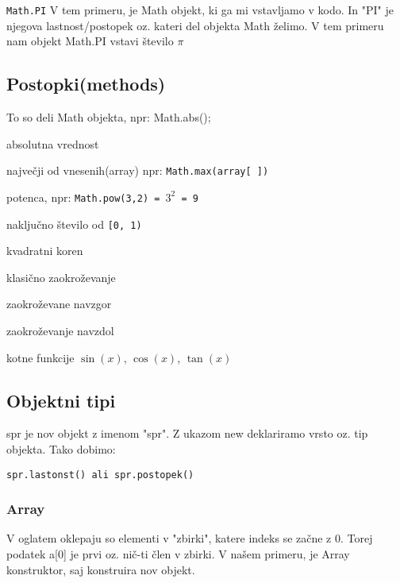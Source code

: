\texttt{Math.PI}
V tem primeru, je Math objekt, ki ga mi vstavljamo v kodo. In "PI" je njegova lastnost/postopek oz. kateri del objekta Math želimo. V tem primeru nam objekt Math.PI vstavi število $\pi$


\subsection{Postopki(methods)}
To so deli Math objekta, npr: Math.abs();
\begin{description}[align=left, , labelwidth=4.5cm]
	\item[abs()] absolutna vrednost
	\item[max()] največji od vnesenih(array) npr: \texttt{Math.max(array[ ])}
	\item[pow()] potenca, npr: \texttt{Math.pow(3,2) = $3^2$ = 9}
	
	\item[random()] naključno število od \texttt{[0, 1)}
	\item[sqrt()] kvadratni koren
	\item[round()] klasično zaokroževanje
	\item[ceil()] zaokroževane navzgor
	\item[floor()] zaokroževanje navzdol
	\item[sin(x), cos(x), tan(x)] kotne funkcije $\sin(x)$, $\cos(x)$, $\tan(x)$
\end{description}

\subsection{Objektni tipi}

{\centering{}\par}
spr je nov objekt z imenom "spr". Z ukazom new deklariramo vrsto oz. tip objekta. Tako dobimo:\

\texttt{spr.lastonst() ali spr.postopek()}

\pagebreak

\subsubsection*{Array}

{\centering{}\par}
V oglatem oklepaju so elementi v "zbirki", katere indeks se začne z 0. Torej podatek a[0] je prvi oz. nič-ti člen v zbirki.
V našem primeru, je Array konstruktor, saj konstruira nov objekt.

